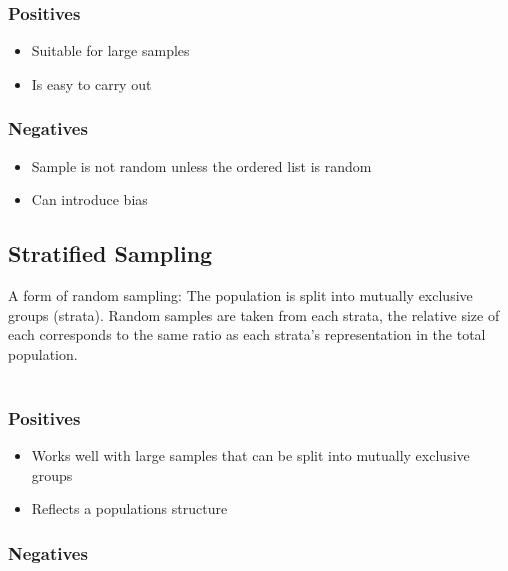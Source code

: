 \documentclass{article}
\begin{document}
\subsubsection{Positives}
    
\begin{itemize}

    \item Suitable for large samples
    \item Is easy to carry out

\end{itemize}

\subsubsection{Negatives}

\begin{itemize}

    \item Sample is not random unless the ordered list is random
    \item Can introduce bias
    
\end{itemize}

\subsection{Stratified Sampling}

A form of random sampling: The population is split into mutually exclusive groups (strata). Random samples are taken from each strata, the relative size of each corresponds to the same ratio as each strata's representation in the total population. \\\\

\subsubsection{Positives}

\begin{itemize}

    \item Works well with large samples that can be split into mutually exclusive groups
    \item Reflects a populations structure
    
\end{itemize}

\subsubsection{Negatives}
\end{document}
